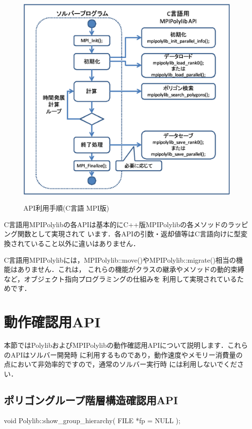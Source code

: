 {\begin{figure}[H]
 \centering
 \includegraphics[width=12cm]{clip025.eps}\\
 \caption{API利用手順(C言語 MPI版)}
\end{figure}

C言語用MPIPolylibの各APIは基本的にC++版MPIPolylibの各メソッドのラッピング関数として実現されて
います．各APIの引数・返却値等はC言語向けに型変換されていること以外に違いはありません．

C言語用MPIPolylibには，MPIPolylib::move()やMPIPolylib::migrate()相当の機能はありません．これは，
これらの機能がクラスの継承やメソッドの動的束縛など，オブジェクト指向プログラミングの仕組みを
利用して実現されているためです．


\pagebreak

%
\section{動作確認用API}

本節ではPolylibおよびMPIPolylibの動作確認用APIについて説明します．これらのAPIはソルバー開発時
に利用するものであり，動作速度やメモリー消費量の点において非効率的ですので，通常のソルバー実行時
には利用しないでください．

%
\subsection{ポリゴングループ階層構造確認用API}

\begin{program}
	void Polylib::show_group_hierarchy(
		FILE	*fp = NULL
	);
\end{program}

}
